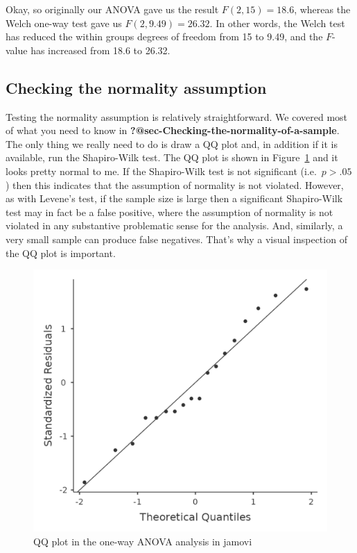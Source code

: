 \documentclass[
  a4paper,
]{book}
\begin{document}
Okay, so originally our ANOVA gave us the result \(F(2, 15) = 18.6\),
whereas the Welch one-way test gave us \(F(2, 9.49) = 26.32\). In other
words, the Welch test has reduced the within groups degrees of freedom
from 15 to 9.49, and the \(F\)-value has increased from 18.6 to 26.32.

\hypertarget{sec-Checking-the-normality-assumption}{%
\subsection{Checking the normality
assumption}\label{sec-Checking-the-normality-assumption}}

Testing the normality assumption is relatively straightforward. We
covered most of what you need to know in
\textbf{?@sec-Checking-the-normality-of-a-sample}. The only thing we
really need to do is draw a QQ plot and, in addition if it is available,
run the Shapiro-Wilk test. The QQ plot is shown in
Figure~\ref{fig-fig13-7} and it looks pretty normal to me. If the
Shapiro-Wilk test is not significant (i.e.~\(p > .05\)) then this
indicates that the assumption of normality is not violated. However, as
with Levene's test, if the sample size is large then a significant
Shapiro-Wilk test may in fact be a false positive, where the assumption
of normality is not violated in any substantive problematic sense for
the analysis. And, similarly, a very small sample can produce false
negatives. That's why a visual inspection of the QQ plot is important.

\begin{figure}

\includegraphics[width=1\textwidth,height=\textheight]{images/fig13-7.png} \hfill{}

\caption{\label{fig-fig13-7}QQ plot in the one-way ANOVA analysis in
jamovi}

\end{figure}
\end{document}
